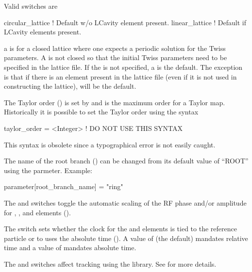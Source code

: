 \noindent
{}
Valid  switches are
\begin{example}
  circular_lattice  ! Default w/o LCavity element present.
  linear_lattice    ! Default if LCavity elements present.
\end{example}
a  is for a closed lattice where one expects a
periodic solution for the Twiss parameters. A  is
not closed so that the initial Twiss parameters need to be specified
in the lattice file. If the  is not specified, a
 is the default. The exception is that if there
is an  element present in the lattice file (even if it is
not used in constructing the lattice),  will be the
default.

The Taylor order () is set by
 and is the maximum order for a Taylor map.
Historically it is possible to set the Taylor order using the syntax
\begin{example}
  taylor_order = <Integer>   ! DO NOT USE THIS SYNTAX
\end{example}
This syntax is obsolete since a typographical error is not easily caught.

The name of the root branch () can be changed from its 
default value of ``ROOT'' using the  parmeter. Example:
\begin{example}
  parameter[root_branch_name] = "ring"
\end{example}

The  and  switches
toggle the automatic scaling of the RF phase and/or amplitude for
, , and  elements ().

The  switch sets whether the clock for the
 and  elements is tied to the reference
particle or to uses the absolute time (). A value of
 (the default) mandates relative time and a value of
 mandates absolute time.

The  and  switches affect tracking using
the  library. See  for more details.

